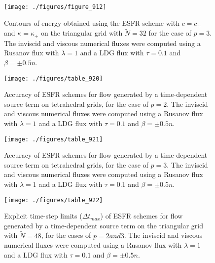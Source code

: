 \begin{figure}
\centering
\texttt{[image: ./figures/figure\_912]} \\
\caption{Contours of energy obtained using the ESFR scheme with $c = c_+$ and $\kappa = \kappa_+$ on the triangular grid with $\tilde{N} = 32$ for the case of $p = 3$. The inviscid and viscous numerical fluxes were computed using a Rusanov flux with $\lambda = 1$ and a LDG flux with $\tau = 0.1$ and $\beta = \pm 0.5n$.}
\label{fig:figure_912}
\end{figure}

\begin{figure}
\centering
\texttt{[image: ./figures/table\_920]} \\
\caption{Accuracy of ESFR schemes for flow generated by a time-dependent source term on tetrahedral grids, for the case of $p = 2$. The inviscid and viscous numerical fluxes were computed using a Rusanov flux with $\lambda = 1$ and a LDG flux with $\tau = 0.1$ and $\beta = \pm 0.5n$.}
\label{fig:table_920}
\end{figure}

\begin{figure}
\centering
\texttt{[image: ./figures/table\_921]} \\
\caption{Accuracy of ESFR schemes for flow generated by a time-dependent source term on tetrahedral grids, for the case of $p = 3$. The inviscid and viscous numerical fluxes were computed using a Rusanov flux with $\lambda = 1$ and a LDG flux with $\tau = 0.1$ and $\beta = \pm 0.5n$.}
\label{fig:table_921}
\end{figure}

\begin{figure}
\centering
\texttt{[image: ./figures/table\_922]} \\
\caption{Explicit time-step limits ($\Delta t_{max}$) of ESFR schemes for flow generated by a time-dependent source term on the triangular grid with $\tilde{N} = 48$, for the cases of $p = 2 and 3$. The inviscid and viscous numerical fluxes were computed using a Rusanov flux with $\lambda = 1$ and a LDG flux with $\tau = 0.1$ and $\beta = \pm 0.5n$.}
\label{fig:table_922}
\end{figure}

